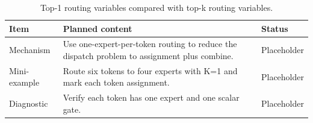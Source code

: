\begin{table}[H]
\centering
\caption{Top-1 routing variables compared with top-k routing variables.}
\label{tab:ch04-why-top-1-routing-is-the-simplest-sparse-case}
\begin{tabularx}{\textwidth}{p{}X p{}}
\toprule
Item & Planned content & Status \\
\midrule
Mechanism & Use one-expert-per-token routing to reduce the dispatch problem to assignment plus combine. & Placeholder \\
Mini-example & Route six tokens to four experts with K=1 and mark each token assignment. & Placeholder \\
Diagnostic & Verify each token has one expert and one scalar gate. & Placeholder \\
\bottomrule
\end{tabularx}
\end{table}
